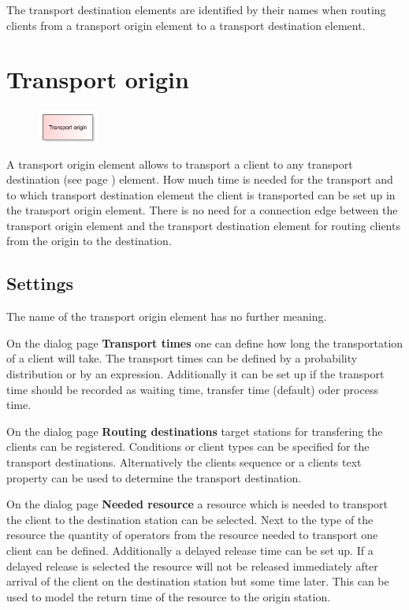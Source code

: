 The transport destination elements are identified by their names when routing
clients from a transport origin element to a transport destination element.


\section{Transport origin}
\label{ref:ModelElementTransportSource}

\begin{figure}
\vspace{-22pt}
\includegraphics[width=2cm]{imageModelElementTransportSource.png}
\vspace{-22pt}
\end{figure}

A transport origin element allows to transport a client to any
transport destination (see page \pageref{ref:ModelElementTransportDestination}) 
element. How much time is needed for the transport and to which
transport destination element the client is transported can be set up
in the transport origin element. 
There is no need for a connection edge between the transport origin element
and the transport destination element for routing clients from the origin to the
destination.

\subsection*{Settings}

The name of the transport origin element has no further meaning.

On the dialog page \textbf{Transport times} one can define how long the transportation
of a client will take. The transport times can be defined by a probability distribution
or by an expression. Additionally it can be set up if the transport time should be recorded
as waiting time, transfer time (default) oder process time.

On the dialog page \textbf{Routing destinations} target stations for transfering the
clients can be registered. Conditions or client types can be specified for the transport
destinations. Alternatively the clients sequence or a clients text property can be used to determine
the transport destination.

On the dialog page \textbf{Needed resource} a resource which is needed to transport
the client to the destination station can be selected. Next to the type of the
resource the quantity of operators from the resource needed to transport one
client can be defined. Additionally a delayed release time can be set up.
If a delayed release is selected the resource will not be released immediately
after arrival of the client on the destination station but some time later.
This can be used to model the return time of the resource to the origin
station.

